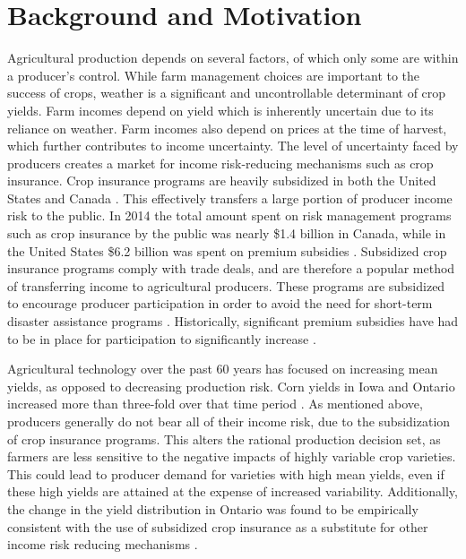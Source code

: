 
\section{Background and Motivation}

Agricultural production depends on several factors, of which only some are within a producer's control. While farm management choices are important to the success of crops, weather is a significant and uncontrollable determinant of crop yields. Farm incomes depend on yield which is inherently uncertain due to its reliance on weather. Farm incomes also depend on prices at the time of harvest, which further contributes to income uncertainty. The level of uncertainty faced by producers creates a market for income risk-reducing mechanisms such as crop insurance. Crop insurance programs are heavily subsidized in both the United States and Canada \citep{rosenzweig2002increased}. This effectively transfers a large portion of producer income risk to the public. In 2014 the total amount spent on risk management programs such as crop insurance by the public was nearly \$1.4 billion in Canada, while in the United States \$6.2 billion was spent on premium subsidies \citep{kerRMP2016}. Subsidized crop insurance programs comply with trade deals, and are therefore a popular method of transferring income to agricultural producers. These programs are subsidized to encourage producer participation in order to avoid the need for short-term disaster assistance programs \citep{coble2013we}. Historically, significant premium subsidies have had to be in place for participation to significantly increase \citep{goodwin2013harm}. 

Agricultural technology over the past 60 years has focused on increasing mean yields, as opposed to decreasing production risk. Corn yields in Iowa and Ontario increased more than three-fold over that time period \citep{CANy,NASSy}. As mentioned above, producers generally do not bear all of their income risk, due to the subsidization of crop insurance programs. This alters the rational production decision set, as farmers are less sensitive to the negative impacts of highly variable crop varieties. This could lead to producer demand for varieties with high mean yields, even if these high yields are attained at the expense of increased variability. Additionally, the change in the yield distribution in Ontario was found to be empirically consistent with the use of subsidized crop insurance as a substitute for other income risk reducing mechanisms \citep{kerRMP2016}. 

